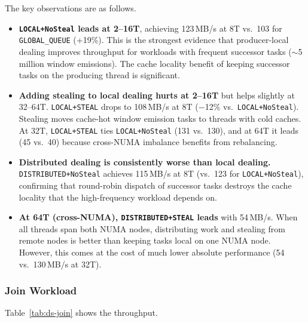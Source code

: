 The key observations are as follows.
%
\begin{itemize}
    \item \textbf{\texttt{LOCAL+NoSteal} leads at 2--16T}, achieving 123\,MB/s at 8T vs.\ 103 for \texttt{GLOBAL\_QUEUE} (+19\%).
    This is the strongest evidence that producer-local dealing improves throughput for workloads with frequent successor tasks ($\sim$5 million window emissions).
    The cache locality benefit of keeping successor tasks on the producing thread is significant.

    \item \textbf{Adding stealing to local dealing hurts at 2--16T} but helps slightly at 32--64T.
    \texttt{LOCAL+STEAL} drops to 108\,MB/s at 8T ($-$12\% vs.\ \texttt{LOCAL+NoSteal}).
    Stealing moves cache-hot window emission tasks to threads with cold caches.
    At 32T, \texttt{LOCAL+STEAL} ties \texttt{LOCAL+NoSteal} (131 vs.\ 130), and at 64T it leads (45 vs.\ 40) because cross-NUMA imbalance benefits from rebalancing.

    \item \textbf{Distributed dealing is consistently worse than local dealing.}
    \texttt{DISTRIBUTED+NoSteal} achieves 115\,MB/s at 8T (vs.\ 123 for \texttt{LOCAL+NoSteal}), confirming that round-robin dispatch of successor tasks destroys the cache locality that the high-frequency workload depends on.

    \item \textbf{At 64T (cross-NUMA), \texttt{DISTRIBUTED+STEAL} leads} with 54\,MB/s.
    When all threads span both NUMA nodes, distributing work and stealing from remote nodes is better than keeping tasks local on one NUMA node.
    However, this comes at the cost of much lower absolute performance (54 vs.\ 130\,MB/s at 32T).
\end{itemize}

\subsubsection{Join Workload}

Table~\ref{tab:ds-join} shows the throughput.

